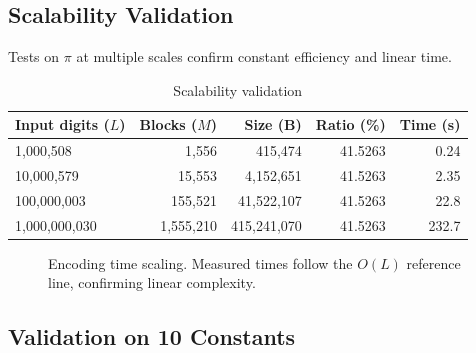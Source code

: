 \documentclass[10pt, conference]{IEEEtran}
\begin{document}
\subsection{Scalability Validation}

Tests on $\pi$ at multiple scales confirm constant efficiency and linear time.

\begin{table}[ht]
\centering
\caption{Scalability validation}
\label{tab:pi_scale}
\begin{tabular}{lrrrr}
\toprule
Input digits ($L$) & Blocks ($M$) & Size (B) & Ratio (\%) & Time (s) \\
\midrule
1,000,508 & 1,556 & 415,474 & 41.5263 & 0.24 \\
10,000,579 & 15,553 & 4,152,651 & 41.5263 & 2.35 \\
100,000,003 & 155,521 & 41,522,107 & 41.5263 & 22.8 \\
1,000,000,030 & 1,555,210 & 415,241,070 & 41.5263 & 232.7 \\
\bottomrule
\end{tabular}
\end{table}

\begin{figure}[ht]
\centering
{}
\caption{Encoding time scaling. Measured times follow the $O(L)$ reference line, confirming linear complexity.}
\label{fig:scalability}
\end{figure}

\subsection{Validation on 10 Constants}
\end{document}
